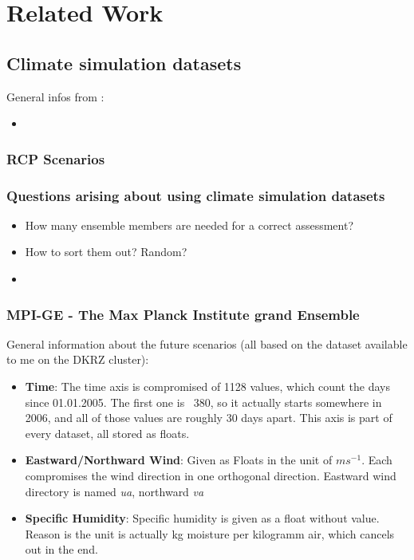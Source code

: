 \chapter{Related Work}

\section{Climate simulation datasets}

General infos from \cite{mpige}:

\begin{itemize}
  \item 
	
\end{itemize}

\subsection{RCP Scenarios}

\subsection{Questions arising about using climate simulation datasets}

\begin{itemize}
  \item How many ensemble members are needed for a correct assessment?
  \item How to sort them out? Random?
  \item 
\end{itemize}

\subsection{MPI-GE - The Max Planck Institute grand Ensemble}

General information about the future scenarios (all based on the dataset available to me on the DKRZ cluster):

\begin{itemize}
  \item \textbf{Time}: The time axis is  compromised of 1128 values, which count the days since 01.01.2005. The first one is ~380, so it actually starts somewhere in 2006, and all of those values are roughly 30 days apart. This axis is part of every dataset, all stored as floats.
  \item \textbf{Eastward/Northward Wind}: Given as Floats in the unit of $ms^{-1}$. Each compromises the wind direction in one orthogonal direction. Eastward wind directory is named \textit{ua}, northward \textit{va}  
  \item \textbf{Specific Humidity}: Specific humidity is given as a float without value. Reason is the unit is actually kg moisture per kilogramm air, which cancels out in the end.
	
\end{itemize}



